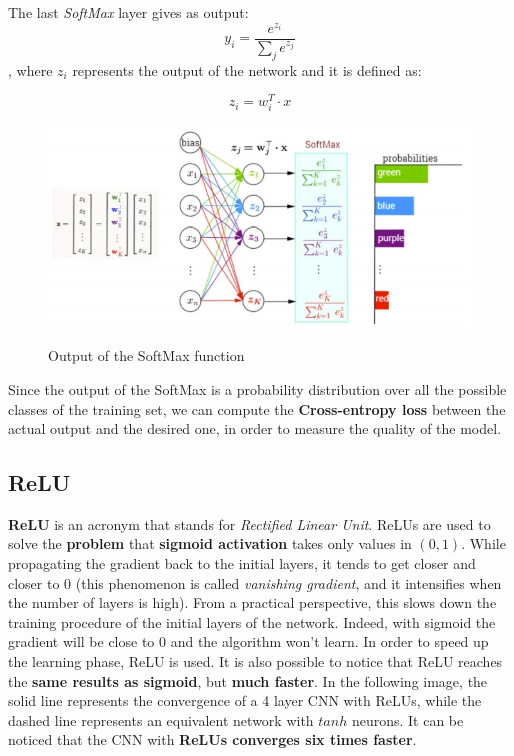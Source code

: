 The last \textit{SoftMax} layer gives as output:
$$y_i = \frac{e^{z_i}}{\sum_j e^{z_j}}$$
, where $z_i$ represents the output of the network and it is defined as:

$$
z_i = w_i^T \cdot x
$$

\begin{figure}[h!]
		\centering
        \includegraphics[scale = 1.5]{img/softmax.jpg}
		\label{mi}
        \caption{Output of the SoftMax function}
\end{figure}

Since the output of the SoftMax is a probability distribution over all the possible classes of the training set, we can compute the \textbf{Cross-entropy loss} between the actual output and the desired one, in order to measure the quality of the model.

\subsection{ReLU} \textbf{ReLU} is an acronym that stands for \textit{Rectified Linear Unit}. ReLUs are used to solve the \textbf{problem} that \textbf{sigmoid activation} takes only values in $(0,1)$. While propagating the gradient back to the initial layers, it tends to get closer and closer to $0$ (this phenomenon is called \textit{vanishing gradient}, and it intensifies when the number of layers is high). From a practical perspective, this slows down the training procedure of the initial layers of the network. Indeed, with sigmoid the gradient will be close to 0 and the algorithm won't learn. In order to speed up the learning phase, ReLU is used.
It is also possible to notice that ReLU reaches the \textbf{same results as sigmoid}, but \textbf{much faster}. In the following image, the solid line represents the convergence of a 4 layer CNN with ReLUs, while the dashed line represents an equivalent network with $tanh$ neurons. It can be noticed that the CNN with \textbf{ReLUs converges six times faster}.

